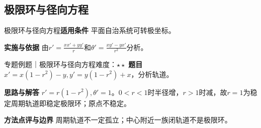\subsection{极限环与径向方程}\label{mat:ode_systems:cycle}
\begin{method}{极限环与径向方程}\textbf{适用条件} 平面自治系统可转极坐标。\par\textbf{实施与依据} 由$r\prime=\frac{xx\prime+yy\prime}{r}$和$\theta\prime=\frac{xy\prime-yx\prime}{r^2}$分析。\end{method}
\begin{example}{专题例题｜极限环与径向方程}{难度：$\star\star$}
\textbf{题目} $x\prime=x(1-r^2)-y,y\prime=y(1-r^2)+x$，分析轨道。\par\textbf{思路与解答} $r\prime=r(1-r^2),\theta\prime=1$。$0<r<1$时半径增，$r>1$时减，故$r=1$为稳定周期轨道即稳定极限环；原点不稳定。\par\textbf{方法点评与边界} 周期轨道不一定孤立；中心附近一族闭轨道不是极限环。
\end{example}

